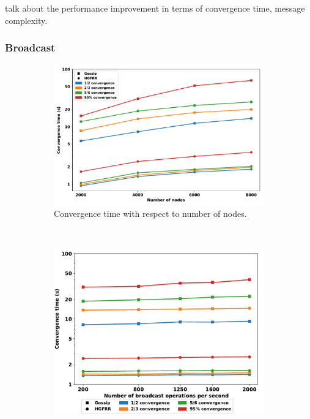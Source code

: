 talk about the performance improvement in terms of convergence time, message complexity.

\subsubsection{Broadcast}

\begin{figure}[t]
  \centering
    \begin{subfigure}[t]{0.35\textwidth}
	  \includegraphics[width=\textwidth]{figures/hgfr_ourgossip_cvgtime_on_num_nodes.pdf}
	  \caption{Convergence time with respect to number of nodes.}
	  \label{hgfr_ourgossip_cvgtime_on_num_nodes}
    \end{subfigure}
	~
    \begin{subfigure}[t]{0.3\textwidth}
    \includegraphics[width=\textwidth]{figures/hgfr_ourgossip_cvgtime_on_tps_2k.pdf}

\end{subfigure}
\end{figure}
